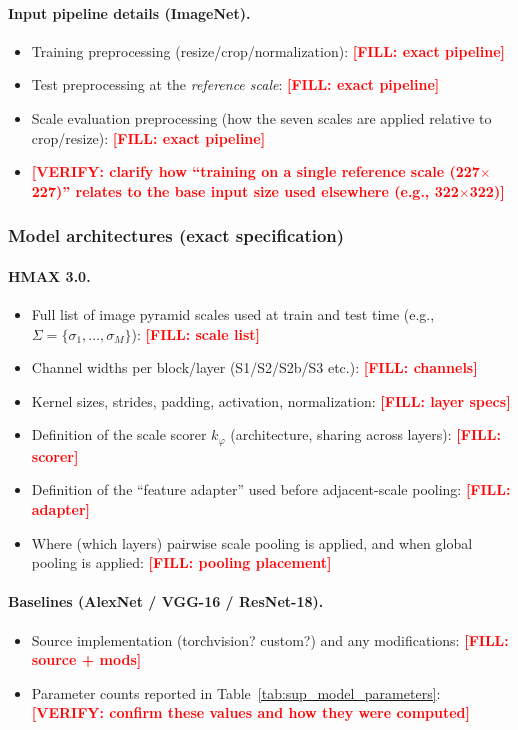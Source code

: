 \documentclass[pdflatex,sn-nature]{sn-jnl}
\newcommand{\FILL}[1]{\textcolor{red}{\textbf{[FILL: #1]}}}
\newcommand{\VERIFY}[1]{\textcolor{red}{\textbf{[VERIFY: #1]}}}
\begin{document}
\paragraph{Input pipeline details (ImageNet).}
\begin{itemize}
    \item Training preprocessing (resize/crop/normalization): \FILL{exact pipeline}
    \item Test preprocessing at the \emph{reference scale}: \FILL{exact pipeline}
    \item Scale evaluation preprocessing (how the seven scales are applied relative to crop/resize): \FILL{exact pipeline}
    \item \VERIFY{clarify how ``training on a single reference scale (227$\times$227)'' relates to the base input size used elsewhere (e.g., 322$\times$322)}
\end{itemize}

\subsubsection*{Model architectures (exact specification)}
\paragraph{HMAX 3.0.}
\begin{itemize}
    \item Full list of image pyramid scales used at train and test time (e.g., $\Sigma=\{\sigma_1,\ldots,\sigma_M\}$): \FILL{scale list}
    \item Channel widths per block/layer (S1/S2/S2b/S3 etc.): \FILL{channels}
    \item Kernel sizes, strides, padding, activation, normalization: \FILL{layer specs}
    \item Definition of the scale scorer $k_\varphi$ (architecture, sharing across layers): \FILL{scorer}
    \item Definition of the ``feature adapter'' used before adjacent-scale pooling: \FILL{adapter}
    \item Where (which layers) pairwise scale pooling is applied, and when global pooling is applied: \FILL{pooling placement}
\end{itemize}

\paragraph{Baselines (AlexNet / VGG-16 / ResNet-18).}
\begin{itemize}
    \item Source implementation (torchvision? custom?) and any modifications: \FILL{source + mods}
    \item Parameter counts reported in Table~\ref{tab:sup_model_parameters}: \VERIFY{confirm these values and how they were computed}
\end{itemize}
\end{document}
